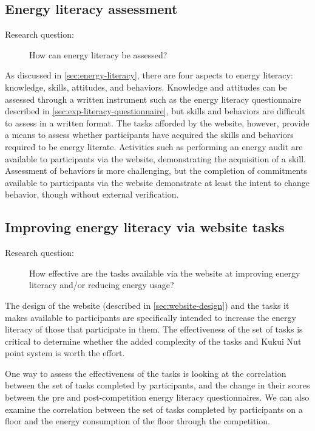 \subsection{Energy literacy assessment}

\begin{description}
\item[Research question:] How can energy literacy be assessed?
\end{description}

As discussed in \autoref{sec:energy-literacy}, there are four aspects to energy literacy: knowledge, skills, attitudes, and behaviors. Knowledge and attitudes can be assessed through a written instrument such as the energy literacy questionnaire described in \autoref{sec:exp-literacy-questionnaire}, but skills and behaviors are difficult to assess in a written format. The tasks afforded by the website, however, provide a means to assess whether participants have acquired the skills and behaviors required to be energy literate. Activities such as performing an energy audit are available to participants via the website, demonstrating the acquisition of a skill. Assessment of behaviors is more challenging, but the completion of commitments available to participants via the website demonstrate at least the intent to change behavior, though without external verification.

\subsection{Improving energy literacy via website tasks}

\begin{description}
\item[Research question:] How effective are the tasks available via the website at improving energy literacy and/or reducing energy usage?
\end{description}

The design of the website (described in \autoref{sec:website-design}) and the tasks it makes available to participants are specifically intended to increase the energy literacy of those that participate in them. The effectiveness of the set of tasks is critical to determine whether the added complexity of the tasks and Kukui Nut point system is worth the effort.

One way to assess the effectiveness of the tasks is looking at the correlation between the set of tasks completed by participants, and the change in their scores between the pre and post-competition energy literacy questionnaires. We can also examine the correlation between the set of tasks completed by participants on a floor and the energy consumption of the floor through the competition.

